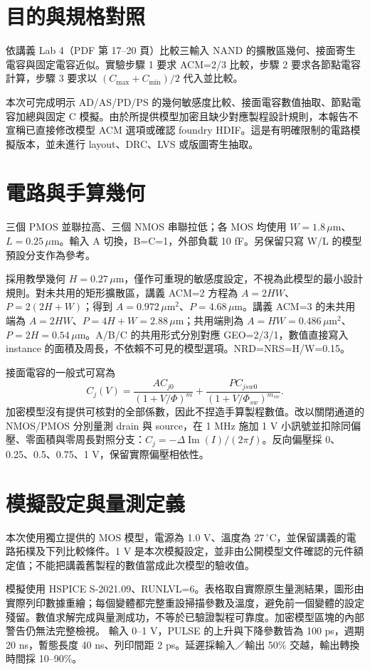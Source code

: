 \section{目的與規格對照}
依講義 Lab 4（PDF 第 17--20 頁）比較三輸入 NAND 的擴散區幾何、接面寄生電容與固定電容近似。實驗步驟 1 要求 ACM=2/3 比較，步驟 2 要求各節點電容計算，步驟 3 要求以 $(C_{\max}+C_{\min})/2$ 代入並比較。

本次可完成明示 AD/AS/PD/PS 的幾何敏感度比較、接面電容數值抽取、節點電容加總與固定 C 模擬。由於所提供模型加密且缺少對應製程設計規則，本報告不宣稱已直接修改模型 ACM 選項或確認 foundry HDIF。這是有明確限制的電路模擬版本，並未進行 layout、DRC、LVS 或版圖寄生抽取。

\section{電路與手算幾何}
三個 PMOS 並聯拉高、三個 NMOS 串聯拉低；各 MOS 均使用 $W=1.8\,\mu$m、$L=0.25\,\mu$m。輸入 A 切換，B=C=1，外部負載 10 fF。另保留只寫 W/L 的模型預設分支作為參考。

採用教學幾何 $H=0.27\,\mu$m，僅作可重現的敏感度設定，不視為此模型的最小設計規則。對未共用的矩形擴散區，講義 ACM=2 方程為 $A=2HW$、$P=2(2H+W)$；得到 $A=0.972\,\mu$m$^2$、$P=4.68\,\mu$m。講義 ACM=3 的未共用端為 $A=2HW$、$P=4H+W=2.88\,\mu$m；共用端則為 $A=HW=0.486\,\mu$m$^2$、$P=2H=0.54\,\mu$m。A/B/C 的共用形式分別對應 GEO=2/3/1，數值直接寫入 instance 的面積及周長，不依賴不可見的模型選項。NRD=NRS=H/W=0.15。

接面電容的一般式可寫為
\[ C_j(V)=\frac{A C_{j0}}{(1+V/\Phi)^m}+\frac{P C_{jsw0}}{(1+V/\Phi_{sw})^{m_{sw}}}. \]
加密模型沒有提供可核對的全部係數，因此不捏造手算製程數值。改以關閉通道的 NMOS/PMOS 分別量測 drain 與 source，在 1 MHz 施加 1 V 小訊號並扣除同偏壓、零面積與零周長對照分支：$C_j=-\Delta\operatorname{Im}(I)/(2\pi f)$。反向偏壓採 0、0.25、0.5、0.75、1 V，保留實際偏壓相依性。

\section{模擬設定與量測定義}
本次使用獨立提供的 MOS 模型，電源為 1.0 V、溫度為 $27\,^{\circ}$C，並保留講義的電路拓樸及下列比較條件。1 V 是本次模擬設定，並非由公開模型文件確認的元件額定值；不能把講義舊製程的數值當成此次模型的驗收值。

模擬使用 HSPICE S-2021.09、RUNLVL=6。表格取自實際原生量測結果，圖形由實際列印數據重繪；每個變體都完整重設掃描參數及溫度，避免前一個變體的設定殘留。數值求解完成與量測成功，不等於已驗證製程可靠度。加密模型區塊的內部警告仍無法完整檢視。
輸入 0--1 V，PULSE 的上升與下降參數皆為 100 ps，週期 20 ns，暫態長度 40 ns、列印間距 2 ps。延遲採輸入／輸出 50\% 交越，輸出轉換時間採 10--90\%。

